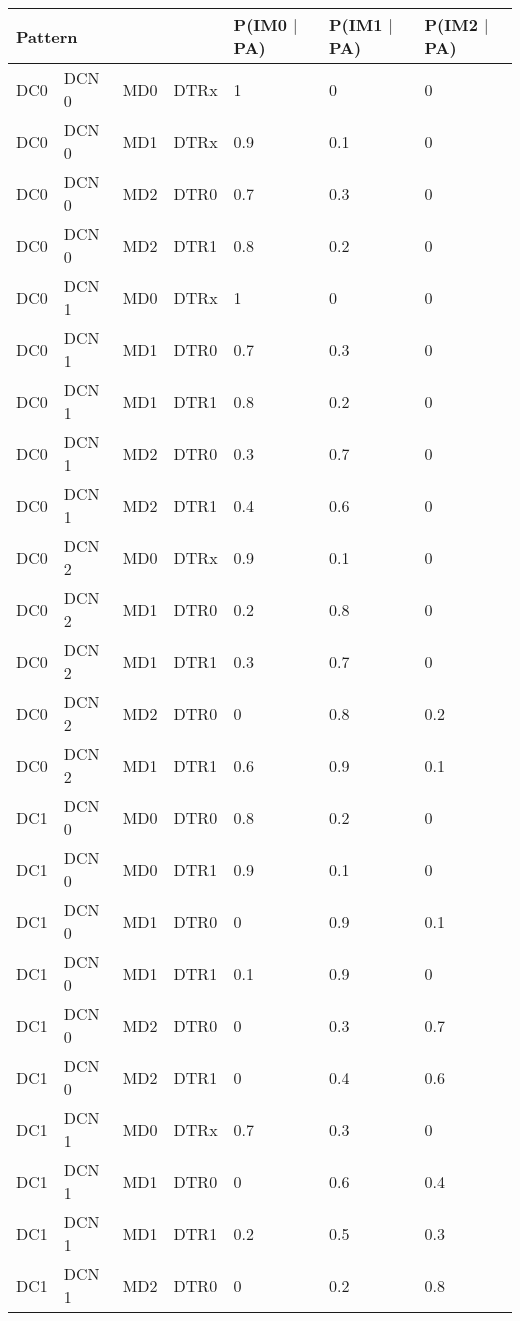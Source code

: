 \documentclass[a4paper,9pt,nil]{article}
\begin{document}
	\begin{table}[!htbp]
		\centering
		\normalsize
		\begin{tabular}{|l|l|l|l|l|l|l|}
			\hline
				\multicolumn{4}{|l|}{Pattern}    & P(IM0 $\mid$ PA) & P(IM1 $\mid$ PA) & P(IM2 $\mid$ PA)\\
			\hline
				DC0 & DCN 0 & MD0 & DTRx & 1 & 0 & 0\\
			\hline
				DC0 & DCN 0 & MD1 & DTRx & 0.9 & 0.1 & 0\\
			\hline
				DC0 & DCN 0 & MD2 & DTR0 & 0.7 & 0.3 & 0\\
			\hline
				DC0 & DCN 0 & MD2 & DTR1 & 0.8 & 0.2 & 0\\
			\hline
				DC0 & DCN 1 & MD0 & DTRx & 1 & 0 & 0\\
			\hline
				DC0 & DCN 1 & MD1 & DTR0 & 0.7 & 0.3 & 0\\
			\hline
				DC0 & DCN 1 & MD1 & DTR1 & 0.8 & 0.2 & 0\\
			\hline
				DC0 & DCN 1 & MD2 & DTR0 & 0.3 & 0.7 & 0\\
			\hline
				DC0 & DCN 1 & MD2 & DTR1 & 0.4 & 0.6 & 0\\
			\hline
				DC0 & DCN 2 & MD0 & DTRx & 0.9 & 0.1 & 0\\
			\hline
				DC0 & DCN 2 & MD1 & DTR0 & 0.2 & 0.8 & 0\\
			\hline
				DC0 & DCN 2 & MD1 & DTR1 & 0.3 & 0.7 & 0\\
			\hline
				DC0 & DCN 2 & MD2 & DTR0 & 0 & 0.8 & 0.2\\
			\hline
				DC0 & DCN 2 & MD1 & DTR1 & 0.6 & 0.9 & 0.1\\
			\hline
				DC1 & DCN 0 & MD0 & DTR0 & 0.8 & 0.2 & 0\\
			\hline
				DC1 & DCN 0 & MD0 & DTR1 & 0.9 & 0.1 & 0\\
			\hline
				DC1 & DCN 0 & MD1 & DTR0 & 0 & 0.9 & 0.1\\
			\hline
				DC1 & DCN 0 & MD1 & DTR1 & 0.1 & 0.9 & 0\\
			\hline
				DC1 & DCN 0 & MD2 & DTR0 & 0 & 0.3 & 0.7\\
			\hline
				DC1 & DCN 0 & MD2 & DTR1 & 0 & 0.4 & 0.6\\
			\hline
				DC1 & DCN 1 & MD0 & DTRx & 0.7 & 0.3 & 0\\
			\hline
				DC1 & DCN 1 & MD1 & DTR0 & 0 & 0.6 & 0.4\\
			\hline
				DC1 & DCN 1 & MD1 & DTR1 & 0.2 & 0.5 & 0.3\\
			\hline
				DC1 & DCN 1 & MD2 & DTR0 & 0 & 0.2 & 0.8\\

\end{tabular}
\end{table}
\end{document}
